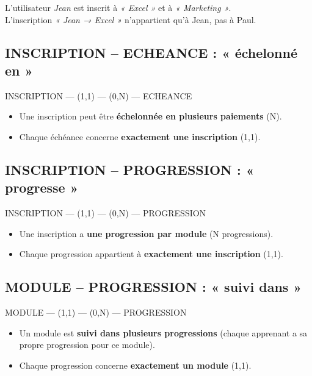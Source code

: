 \documentclass[12pt,a4paper]{article}
\begin{document}
\begin{exemplebox}
    \small
    L'utilisateur \textit{Jean} est inscrit à \textit{« Excel »} et à \textit{« Marketing »}. \\
    L'inscription \textit{« Jean → Excel »} n'appartient qu'à Jean, pas à Paul.
\end{exemplebox}

\subsection{INSCRIPTION -- ECHEANCE : « échelonné en »}


INSCRIPTION --- (1,1) --- (0,N) --- ECHEANCE


\begin{itemize}
    \item Une inscription peut être \textbf{échelonnée en plusieurs paiements} (N).
    \item Chaque échéance concerne \textbf{exactement une inscription} (1,1).
\end{itemize}

\subsection{INSCRIPTION -- PROGRESSION : « progresse »}


INSCRIPTION --- (1,1) --- (0,N) --- PROGRESSION


\begin{itemize}
    \item Une inscription a \textbf{une progression par module} (N progressions).
    \item Chaque progression appartient à \textbf{exactement une inscription} (1,1).
\end{itemize}

\subsection{MODULE -- PROGRESSION : « suivi dans »}


MODULE --- (1,1) --- (0,N) --- PROGRESSION


\begin{itemize}
    \item Un module est \textbf{suivi dans plusieurs progressions} (chaque apprenant a sa propre progression pour ce module).
    \item Chaque progression concerne \textbf{exactement un module} (1,1).
\end{itemize}
\end{document}
